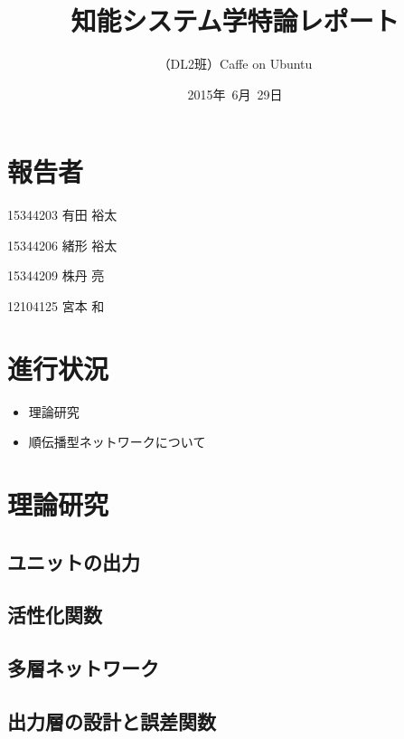 \documentclass[a4paper,10pt]{jsarticle}
\title{知能システム学特論レポート}
\author{
（DL2班）Caffe on Ubuntu\\
}
\date{2015年\ 6月\ 29日}
\begin{document}
\maketitle
\section{報告者}
\begin{list}{}{}
 \item 15344203\hspace{0.5cm} 有田 裕太
 \item 15344206\hspace{0.5cm} 緒形 裕太
 \item 15344209\hspace{0.5cm} 株丹 亮
 \item 12104125\hspace{0.5cm} 宮本 和
\end{list}

\section{進行状況}

\begin{itemize}
\item 理論研究
\item 順伝播型ネットワークについて
\end{itemize}


\section{理論研究}
\subsection{ユニットの出力}

\subsection{活性化関数}

\subsection{多層ネットワーク}

\subsection{出力層の設計と誤差関数}
\end{document}
